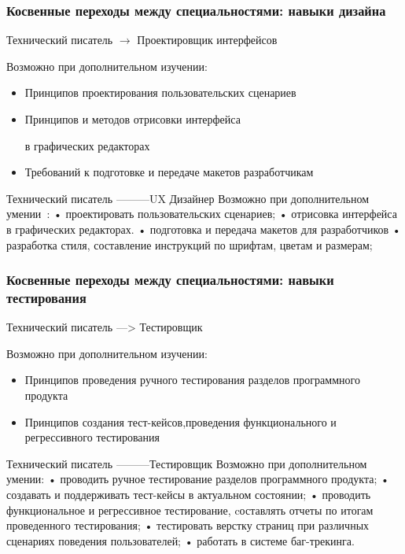 \documentclass{../industrial-development}
\begin{document}
\begin{frame} \frametitle{Косвенные переходы между специальностями: навыки дизайна }

\begin{block}{Технический писатель $\rightarrow$ Проектировщик интерфейсов}

Возможно при дополнительном изучении:
  \end{block}
\begin{itemize}
  \item Принципов проектирования пользовательских сценариев
  \item Принципов и методов отрисовки интерфейса 

в графических редакторах
\item Требований к подготовке и передаче макетов разработчикам
  \end{itemize}
\end{frame}

\lecturenotes

Технический писатель ---------UX Дизайнер
Возможно при дополнительном умении~\cite{rab}:
•	проектировать пользовательских сценариев;
•	отрисовка интерфейса в графических редакторах.
•	подготовка и передача макетов для разработчиков
•	разработка стиля, составление инструкций по шрифтам, цветам и размерам;

\begin{frame} \frametitle{Косвенные переходы между специальностями: навыки тестирования}
\begin{block}{Технический писатель ---> Тестировщик}

Возможно при дополнительном изучении:
  \end{block}
\begin{itemize}
  \item Принципов проведения ручного тестирования разделов программного продукта
  \item Принципов создания тест-кейсов,проведения функционального и регрессивного тестирования
  \end{itemize}
\end{frame}

\lecturenotes


Технический писатель ---------Тестировщик
Возможно при дополнительном умении:
•	проводить ручное тестирование разделов программного продукта;
•	создавать и поддерживать тест-кейсы в актуальном состоянии;
•	проводить функциональное и регрессивное тестирование, cоставлять отчеты по итогам проведенного тестирования;
•	тестировать верстку страниц при различных сценариях поведения пользователей;
•	работать в системе баг-трекинга.
\end{document}
